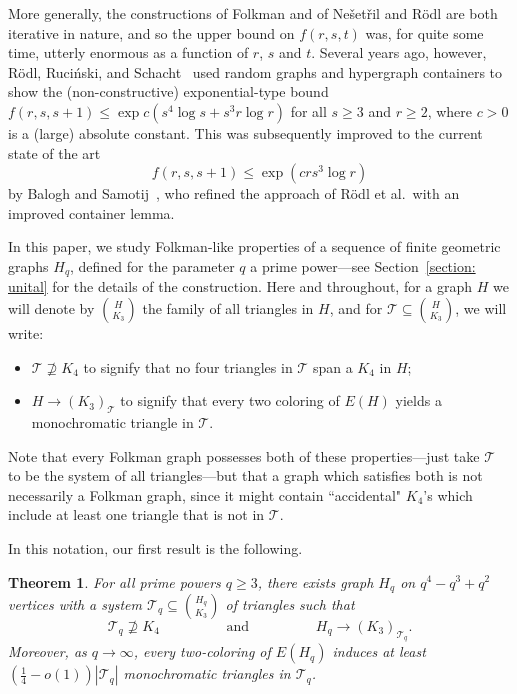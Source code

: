 \documentclass[A4paper,reqno,oneside,12pt]{amsart}
\theoremstyle{plain}
\newtheorem{theorem}{Theorem}[section]
\theoremstyle{definition}
\newcommand{\scT}{\mathscr{T}}
\begin{document}
More generally, the constructions of Folkman and of Ne\v{s}et\v{r}il and R\"odl are both iterative in nature, and so the upper bound on $f(r,s,t)$ was, for quite some time, utterly enormous as a function of $r$, $s$ and $t$.
Several years ago, however, R\"odl, Ruci\'nski, and Schacht~\cite{RRS17} used random graphs and hypergraph containers to show the (non-constructive) exponential-type bound $f(r,s,s+1) \leq \exp{c(s^4 \log s + s^3 r \log r)}$ for all $s \geq 3$ and $r \geq 2$, where $c > 0$ is a (large) absolute constant.
This was subsequently improved to the current state of the art
\begin{equation}
\label{eq: f(r,s,s+1)}
    f(r,s,s+1) \leq \exp(c rs^3 \log r)
\end{equation}
by Balogh and Samotij~\cite{BS20}, who refined the approach of R\"odl et al.~with an improved container lemma.


In this paper, we study Folkman-like properties of a sequence of finite geometric graphs $H_q$, defined for the parameter $q$ a prime power---see Section~\ref{section: unital} for the details of the construction.
Here and throughout, for a graph $H$ we will denote by $\binom{H}{K_3}$ the family of all triangles in $H$, and for $\scT \subseteq \binom{H}{K_3}$, we will write:
\begin{itemize}
    \item $\scT \nsupseteq K_4$ to signify that no four triangles in $\scT$ span a $K_4$ in $H$;
    \item $H \longrightarrow (K_3)_{\scT}$ to signify that every two coloring of $E(H)$ yields a monochromatic triangle in $\scT$.
\end{itemize}
Note that every Folkman graph possesses both of these properties---just take $\scT$ to be the system of all triangles---but that a graph which satisfies both is not necessarily a Folkman graph, since it might contain ``accidental" $K_4$'s which include at least one triangle that is not in $\scT$.

In this notation, our first result is the following.

\begin{theorem}
\label{thm: main-1}
    For all prime powers $q \geq 3$, there exists graph $H_q$ on $q^4-q^3+q^2$ vertices  with a system $\scT_q \subseteq \binom{H_q}{K_3}$ of triangles such that 
    \begin{equation}
    \label{eq: quasi-folkman}
        \scT_q \nsupseteq K_4 \hspace{2cm} \text{and} \hspace{2cm} H_q \longrightarrow (K_3)_{\scT_q}.
    \end{equation}
    Moreover, as $q \to \infty$, every two-coloring of $E(H_q)$ induces at least $(\frac{1}{4}-o(1))|\scT_q|$ monochromatic triangles in $\scT_q$.
\end{theorem}
\end{document}
